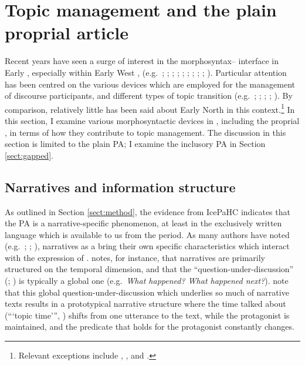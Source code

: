 \documentclass[output=paper,colorlinks,citecolor=brown]{langscibook}
\begin{document}
\section{Topic management and the plain proprial article}\label{sect:plain}

Recent years have seen a surge of interest in the morphosyntax-- interface in Early , especially within Early West , (e.g.~\citealp{Trips2009syntax}; \citealp{HinterholzlPetrova09, hinterholzl2010v1}; \citealp{petrova2010evidence}; \citealp{Epstein2011}; \citealp{Breban12}; \citealp{MeurmanSolinetal12}; \citealp{vangelderen2013diachrony}; \citealp{BechEide14}; \citealp{los-Kem2018}; \citealp{catasso2021he}). Particular attention has been centred on the various devices which are employed for the management of discourse participants, and different types of topic transition (e.g.~\citealp{Epstein2011}; \citealp{Breban12}; \citealp{vangelderen2013diachrony}; \citealp{los-Kem2018}; \citealp{catasso2021he}). By comparison, relatively little has been said about Early North  in this context.\footnote{Relevant exceptions include \citet{kossuth1980-narrative-syntax}, \citet{leiss2007covert}, and \citet{booth-beck2021jhs}.} In this section, I examine various morphosyntactic devices in , including the proprial , in terms of how they contribute to topic management. The discussion in this section is limited to the plain PA; I examine the inclusory PA in Section \ref{sect:gapped}.

\subsection{Narratives and information structure}

As outlined in Section \ref{sect:method}, the evidence from IcePaHC indicates that the PA is a narrative-specific phenomenon, at least in the exclusively written language which is available to us from the period. As many authors have noted (e.g.~\citealp{carroll2003information}; \citealp{dimroth2010given}; \citealp{riester2015analyzing}), narratives as a  bring their own specific characteristics which interact with the expression of . \citet{riester2015analyzing} notes, for instance, that narratives are primarily structured on the temporal dimension, and that the ``question-under-discussion'' (\citealp{vonStutterheim1989referential}; \citealp{vankuppelt1995discourse}) is typically a global one (e.g.~\textit{What happened? What happened next?}). \citet{dimroth2010given} note that this global question-under-discussion which underlies so much of narrative texts results in a prototypical narrative structure where the time talked about (```topic time''', \citealp{klein1994time}) shifts from one utterance to the text, while the protagonist is maintained, and the predicate that holds for the protagonist constantly changes. 
\end{document}
